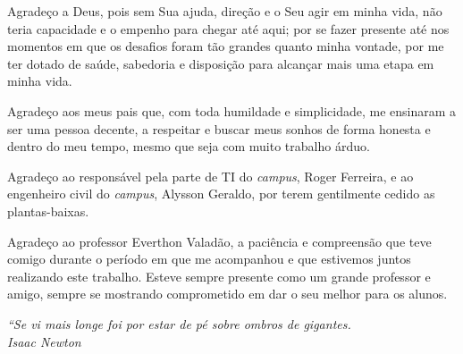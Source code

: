 \documentclass[
	12pt,				%
	openright,			%
	twoside,			%
	a4paper,			%
	english,			%
	french,				%
	spanish,			%
	brazil				%
	]{abntex2}
\begin{document}
\begin{agradecimentos}

Agradeço a Deus, pois sem Sua ajuda, direção e o Seu agir em minha vida, não teria capacidade e o empenho para chegar até aqui; por se fazer presente até nos momentos em que os desafios foram tão grandes quanto minha vontade, por me ter dotado de saúde, sabedoria e disposição para alcançar mais uma etapa em minha vida.

Agradeço aos meus pais que, com toda humildade e simplicidade, me ensinaram a ser uma pessoa decente, a respeitar e buscar meus sonhos de forma honesta e dentro do meu tempo, mesmo que seja com muito trabalho árduo. 

Agradeço ao responsável pela parte de TI do \textit{campus}, Roger Ferreira, e ao engenheiro civil do \textit{campus}, Alysson Geraldo, por terem gentilmente cedido as plantas-baixas.

Agradeço ao professor Everthon Valadão, a paciência e compreensão que teve comigo durante o período em que me acompanhou e que estivemos juntos realizando este trabalho. Esteve sempre presente como um grande professor e amigo, sempre se mostrando comprometido em dar o seu melhor para os alunos. 


\end{agradecimentos}

\begin{epigrafe}
    \vspace*{\fill}
	\begin{flushright}
		\textit{``Se vi mais longe foi por estar de pé sobre ombros de gigantes.\\
		Isaac Newton}
	\end{flushright}
\end{epigrafe}

\end{document}
